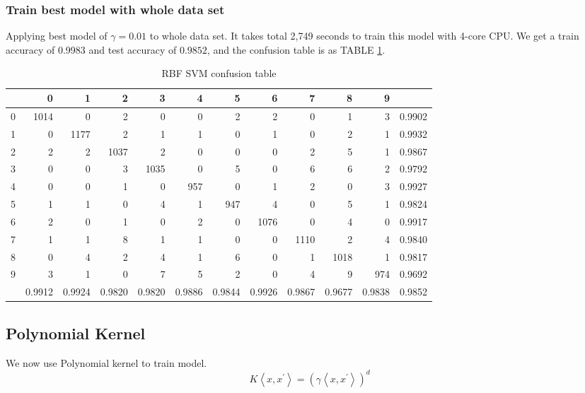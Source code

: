 \documentclass[conference]{IEEEtran}
\begin{document}
\subsubsection{Train best model with whole data set}
Applying best model of $\gamma=0.01$ to whole data set. It takes total 2,749 seconds to train this model with 4-core CPU. We get a train accuracy of 0.9983 and test accuracy of $0.9852$, and the confusion table is as TABLE \ref{tab:RBF SVM confusion table}.
\begin{table}[htbp]
\tiny
  \centering
  \caption{RBF SVM confusion table}
\begin{tabular}{|r|rrrrrrrrrr|r|}
\hline
  & 0 & 1 & 2 & 3 & 4 & 5 & 6 & 7 & 8 & 9 &  \\
\hline
0 & 1014 & 0 & 2 & 0 & 0 & 2 & 2 & 0 & 1 & 3 & 0.9902 \\
1 & 0 & 1177 & 2 & 1 & 1 & 0 & 1 & 0 & 2 & 1 & 0.9932 \\
2 & 2 & 2 & 1037 & 2 & 0 & 0 & 0 & 2 & 5 & 1 & 0.9867 \\
3 & 0 & 0 & 3 & 1035 & 0 & 5 & 0 & 6 & 6 & 2 & 0.9792 \\
4 & 0 & 0 & 1 & 0 & 957 & 0 & 1 & 2 & 0 & 3 & 0.9927 \\
5 & 1 & 1 & 0 & 4 & 1 & 947 & 4 & 0 & 5 & 1 & 0.9824 \\
6 & 2 & 0 & 1 & 0 & 2 & 0 & 1076 & 0 & 4 & 0 & 0.9917 \\
7 & 1 & 1 & 8 & 1 & 1 & 0 & 0 & 1110 & 2 & 4 & 0.9840 \\
8 & 0 & 4 & 2 & 4 & 1 & 6 & 0 & 1 & 1018 & 1 & 0.9817 \\
9 & 3 & 1 & 0 & 7 & 5 & 2 & 0 & 4 & 9 & 974 & 0.9692 \\
\hline
  & 0.9912 & 0.9924 & 0.9820 & 0.9820 & 0.9886 & 0.9844 & 0.9926 & 0.9867 & 0.9677 & 0.9838 & 0.9852 \\
\hline
\end{tabular}%

  \label{tab:RBF SVM confusion table}%
\end{table}%



\subsection{Polynomial Kernel}
We now use Polynomial kernel to train model.
$$
K\left\langle x, x^{\prime}\right\rangle=\left(\gamma\left\langle x, x^{\prime}\right\rangle\right)^{d}
$$
\end{document}
